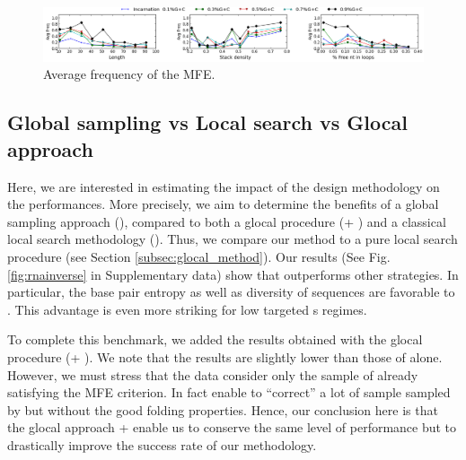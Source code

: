 \begin{figure}[ht!]
	\centering
	\includegraphics[width=\textwidth]{Figures/freq.png}
	\caption{Average frequency of the MFE.}
	\label{fig:freq}
\end{figure}

\subsection{Global sampling vs Local search vs Glocal approach}
Here, we are interested in estimating the impact of the design methodology on the performances. More precisely, we aim to determine the benefits of a global sampling approach (\ourprog), compared to both a glocal procedure (\ourprog + \RNAinverse) and a classical local search methodology (\RNAinverse). Thus, we compare our method to a pure local search procedure (see Section \ref{subsec:glocal_method}). Our results (See Fig. \ref{fig:rnainverse} in Supplementary data) show that \ourprog outperforms other strategies. In particular, the base pair entropy as well as diversity of sequences are favorable to \ourprog. This advantage is even more striking for low targeted \GCContent{}s regimes.

To complete this benchmark, we added the results obtained with the glocal procedure (\ourprog + \RNAinverse). We note that the results are slightly lower than those of \ourprog alone. However, we must stress that the \ourprog data consider only the sample of \ourprog already satisfying the MFE criterion. In fact \RNAinverse enable to ``correct'' a lot of sample sampled by \ourprog but without the good folding properties. Hence, our conclusion here is that the glocal approach \ourprog + \RNAinverse enable us to conserve the same level of performance but to drastically improve the success rate of our methodology. 






\label{fig:rnainverse}

